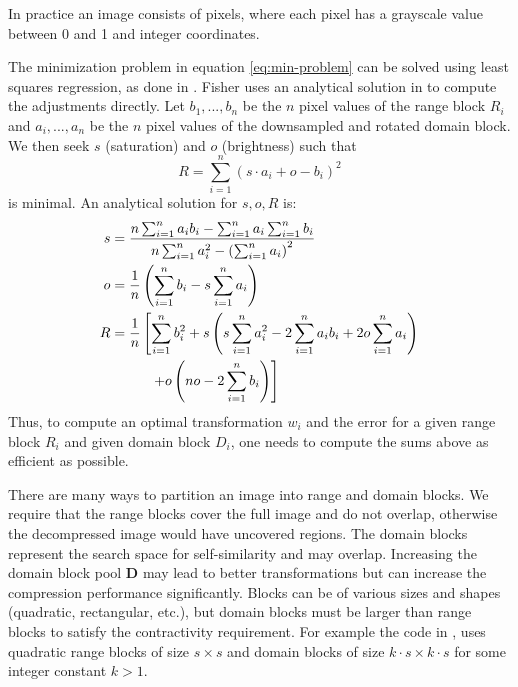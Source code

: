  \label{par-practical-implementation}
In practice an image consists of pixels, where each pixel has a grayscale value between 0 and 1 and integer coordinates.

The minimization problem in equation \ref{eq:min-problem} can be solved using least squares regression, as done in \cite{github-python}.
Fisher uses an analytical solution in \cite{fisher2012} to compute the adjustments directly. Let $b_1, ..., b_n$ be the $n$ pixel values of the range block $R_i$
and $a_i,...,a_n$ be the $n$ pixel values of the downsampled and rotated domain block. We then seek $s$ (saturation) and $o$ (brightness) such that
$$
R = \sum_{i=1}^n (s \cdot a_i + o - b_i)^2
$$
is minimal. An analytical solution for $s,o,R$ is:
\begin{align}
    s &= \frac{n \sum_{i=1}^n a_i b_i - \sum_{i=1}^n a_i \sum_{i=1}^n b_i}{n \sum_{i=1}^n a_i^2 - \left(\sum_{i=1}^n a_i \right)^2} \label{contrast}\\
    o &= \frac{1}{n} \left( \sum_{i=1}^n b_i - s \sum_{i=1}^n a_i \right) \label{brightness}\\
    R &= \frac{1}{n} \left[ \sum_{i=1}^n b_i^2 + s \left( s \sum_{i=1}^n a_i^2 - 2 \sum_{i=1}^n a_i b_i + 2o \sum_{i=1}^n a_i \right) \right. \notag\\
    &\text{\hspace{1cm}} \left. + o \left(no - 2 \sum_{i=1}^n b_i \right)  \right]\label{error}
    \end{align}
Thus, to compute an optimal transformation $w_i$ and the error for a given range block $R_i$ and given domain block $D_i$, one needs to compute the sums above
as efficient as possible.

 There are many ways to partition an image into range
and domain blocks. We require that the range blocks cover the full image and do
not overlap, otherwise the decompressed image would have uncovered regions. The
domain blocks represent the search space for self-similarity and may overlap.
Increasing the domain block pool $\boldsymbol{D}$ may lead to better
transformations but can increase the compression performance significantly.
Blocks can be of various sizes and shapes (quadratic, rectangular, etc.), but
domain blocks must be larger than range blocks to satisfy the contractivity
requirement. For example the code in \cite{github-python}, uses quadratic range
blocks of size $s \times s$ and domain blocks of size
$k\cdot s \times k \cdot s$ for some integer constant $k > 1$.

